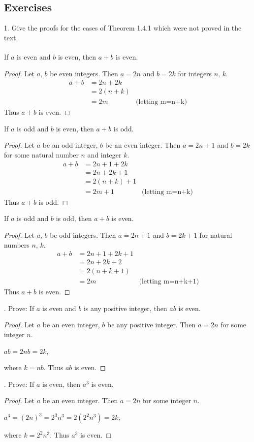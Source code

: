\documentclass[12pt]{article}
\begin{document}
\subsection*{Exercises}
1. Give the proofs for the cases of Theorem 1.4.1 which were not proved in the text. \\
\\
If $a$ is even and $b$ is even, then $a+b$ is even.
\begin{proof}
Let $a$, $b$ be even integers. Then $a=2n$ and $b=2k$ for integers $n$, $k$.
\begin{align*}
a+b&=2n+2k \\
&=2(n+k) \\
&=2m &\text{(letting m=n+k)}
\end{align*}
Thus $a+b$ is even.
\end{proof}
\noindent If $a$ is odd and $b$ is even, then $a+b$ is odd.
\begin{proof}
Let $a$ be an odd integer, $b$ be an even integer. Then $a=2n+1$ and $b=2k$ for some natural number $n$ and integer $k$.
\begin{align*}
a+b&=2n+1+2k \\
&=2n+2k+1 \\
&=2(n+k)+1 \\
&=2m+1 &\text{(letting m=n+k)}
\end{align*}
Thus $a+b$ is odd.
\end{proof}
\noindent If $a$ is odd and $b$ is odd, then $a+b$ is even.
\begin{proof}
Let $a$, $b$ be odd integers. Then $a=2n+1$ and $b=2k+1$ for natural numbers $n$, $k$.
\begin{align*}
a+b&=2n+1+2k+1 \\
&=2n+2k+2 \\
&=2(n+k+1) \\
&=2m &\text{(letting m=n+k+1)}
\end{align*}
Thus $a+b$ is even.
\end{proof}
. Prove: If $a$ is even and $b$ is any positive integer, then $ab$ is even.
\begin{proof}
Let $a$ be an even integer, $b$ be any positive integer. Then $a=2n$ for some integer $n$.
\begin{center}
$ab=2nb=2k$,
\end{center}
where $k=nb$. Thus $ab$ is even.
\end{proof}
. Prove: If $a$ is even, then $a^3$ is even.
\begin{proof}
Let $a$ be an even integer. Then $a=2n$ for some integer $n$.
\begin{center}
$a^3=(2n)^3=2^3n^3=2(2^2n^3)=2k$,
\end{center}
where $k=2^2n^3$. Thus $a^3$ is even.
\end{proof}
\end{document}
